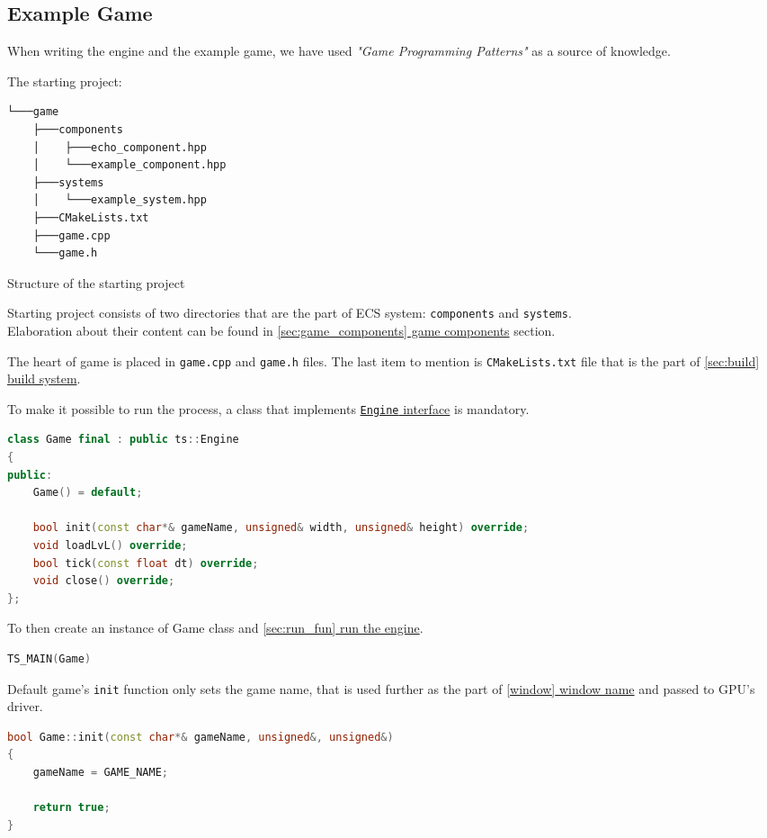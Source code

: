 \newpage
\subsection{Example Game}
\hspace{\parindent}
When writing the engine and the example game, we have used \textit{"Game Programming Patterns"} \cite{GameProgrammingPatterns} as a source of knowledge.

The starting project:
\begin{verbatim}
└───game
    ├───components
    │    ├───echo_component.hpp
    │    └───example_component.hpp
    ├───systems
    │    └───example_system.hpp
    ├───CMakeLists.txt
    ├───game.cpp
    └───game.h
\end{verbatim}
\begin{table}[h]
\caption{Structure of the starting project}
\end{table}

Starting project consists of two directories that are the part of ECS system: \texttt{components} and \texttt{systems}.\\Elaboration about their content can be found in \hyperref[sec:game_components]{\ref*{sec:game_components} game components} section.

The heart of game is placed in \texttt{game.cpp} and \texttt{game.h} files. The last item to mention is \texttt{CMakeLists.txt} file that is the part of \hyperref[sec:build]{\ref*{sec:build} build system}.

To make it possible to run the process, a class that implements \hyperref[sec:engine_class]{\texttt{Engine} interface} is mandatory. 
\begin{lstlisting}[language=c++, caption=An example of a game class header (./game/game.h)]
class Game final : public ts::Engine
{
public:
    Game() = default;

    bool init(const char*& gameName, unsigned& width, unsigned& height) override;
    void loadLvL() override;
    bool tick(const float dt) override;
    void close() override;
};
\end{lstlisting}
To then create an instance of Game class and \hyperref[sec:run_fun]{\ref*{sec:run_fun} run the engine}.
\begin{lstlisting}[language=c++, caption=A game instance (./game/game.cpp)]
TS_MAIN(Game)
\end{lstlisting}
Default game's \texttt{init} function only sets the game name, that is used further as the part of \hyperref[window]{\ref*{window} window name} and passed to GPU's driver.
\begin{lstlisting}[language=c++, caption=An example of a game \texttt{init} function (./game/game.cpp)]
bool Game::init(const char*& gameName, unsigned&, unsigned&)
{
    gameName = GAME_NAME;

    return true;
}
\end{lstlisting}

